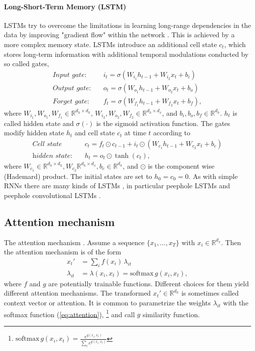 \documentclass[12pt,a4paper]{article}
\begin{document}
\paragraph{Long-Short-Term Memory (LSTM)}
LSTMs \cite{lstm, 	schmidhuber_1999_learning_to_forget} try to overcome the limitations in learning long-range dependencies in the data by improving "gradient flow" within the network \cite{Sherstinsky_2020}. This is achieved by a more complex memory state. LSTMs introduce an additional cell state $c_t$,  which stores long-term information with additional temporal modulations conducted by so called gates, 
\begin{align}
	\textit{Input gate:}&  \quad i_t = \sigma \left( 
	 W_{i_1} h_{t-1} + W_{i_2} x_{t} + b_i
	 \right)\\ 
	\textit{Output gate:}& \quad  o_t = \sigma \left( 
	W_{o_1} h_{t-1} + W_{o_2} x_{t} + b_o
	\right)\\ 
	\textit{Forget gate:}& \quad  f_t = \sigma \left(
	W_{f_1} h_{t-1} + W_{f_2} x_{t} + b_f
	 \right), 
\end{align}
where  $W_{i_1}, W_{o_1}, W_{f_1} \in \mathbb{R} ^ {d_h \times d_h}$,  $W_{i_2}, W_{o_2}, W_{f_2} \in \mathbb{R} ^ {d_h \times d_x}$, and $b_i, b_o, b_f \in \mathbb{R}^{d_h}$. $h_t$ is called hidden state and  $\sigma (\cdot)$ is the sigmoid activation function. The gates modify hidden state $h_t$ and cell state $c_t$ at time $t$ according to  
\begin{align}
	 \textit{Cell state}& \quad  c_t = 
	 f_t \odot c_{t-1} + i_t \odot \left (W_{c_1} h_{t-1} + W_{c_2} x_t + b_c  \right) \\
	 \textit{hidden state:}& \quad  h_t = 
	 o_t \odot \tanh(c_{t}), 	 
\end{align}
where $W_{c_1} \in \mathbb{R}^{d_h \times d_h}, W_{c_2} \mathbb{R}^{d_h \times d_x}, b_c \in \mathbb{R}^{d_h}$, and  $\odot$ is the component wise (Hademard) product. The initial states are set to $h_0=c_0=0$.
As with simple RNNs there are many kinds of LSTMs \cite{Greff_2017}, in particular peephole LSTMs \cite{Gers_2001, gers2002learning} and peephole convolutional LSTMs \cite{shi2015convolutional}.

\subsection{Attention mechanism}
The attention mechanism \cite{bahdanau_2016_attention, cho_2014_attention, luong_2015_attention}. Assume a sequence $\{x_1, \dots, x_T\}$ with $x_i \in \mathbb R ^{d_x}$. Then the attention mechanism is of the form
\begin{align}
	x_t' &= \sum_i f(x_i) \, \lambda_{it} \label{eq:attention_context}\\ 
	\lambda_{it} &= \lambda(x_i, x_t) =  \text{softmax}\, g(x_i, x_t) \label{eq:attention},
\end{align}
where  $f$ and $g$ are potentially trainable functions. Different choices for them yield different attention mechanisms. The transformed $x_t'\in \mathbb R ^{d_h}$ is sometimes called context vector or attention. It is common to parametrize the weights $\lambda_{it}$ with the softmax function (\ref{eq:attention}), \footnote{$\text{softmax}\, g(x_i, x_t) = \frac {e^{g(x_i, x_t)} }{\sum_i e^{g(x_i, x_t)}}$}  and call $g$ similarity function. 
\end{document}

